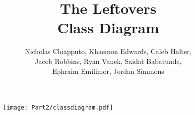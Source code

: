 \documentclass[11pt]{article}
\begin{document}
	\title{ \vspace{-1in}The Leftovers \\
			\Large{Class Diagram} }

	\author{	Nicholas Chiapputo, Khaemon Edwards, Caleb Halter, \\
				Jacob Robbins, Ryan Vanek, Saidat Babatunde, \\
				Ephraim Emilimor, Jordan Simmons
	}

	\maketitle

	\begin{figure}[H]
		\vspace{-0.5in}
		\centering
		\texttt{[image: Part2/classdiagram.pdf]}
	\end{figure} %
\end{document}
